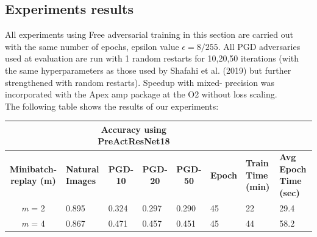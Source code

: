 \documentclass{article}
\begin{document}
\subsection{Experiments results}
All experiments using Free adversarial training in this section are carried out with the same number of epochs, epsilon value $\epsilon = 8/255$. All PGD adversaries used at
evaluation are run with 1 random restarts for 10,20,50 iterations (with the same hyperparameters as those
used by Shafahi et al. (2019) \cite{ShafahiEtAl2019b} but further strengthened with random restarts). Speedup with mixed-
precision was incorporated with the Apex amp package at the O2 without loss scaling.\\
The following table shows the results of our experiments:
\begin{table}[hbt!]
\begin{tabular}{|c|l|l|l|l|l|l|p{2cm}|}
\hline
\multicolumn{1}{|l|}{{ }}        & \multicolumn{4}{c|}{{ \textbf{Accuracy using PreActResNet18}}}                                                                                                                                                                            & \multicolumn{3}{l|}{{ }}                                                                                                                                                       \\ \hline
{ \textbf{Minibatch-replay (m)}} & \multicolumn{1}{p{1.5cm}|}{{ \textbf{Natural Images}}} & \multicolumn{1}{c|}{{ \textbf{PGD-10}}} & \multicolumn{1}{c|}{{ \textbf{PGD-20}}} & \multicolumn{1}{c|}{{ \textbf{PGD-50}}} & \multicolumn{1}{c|}{{ \textbf{Epoch}}} & \multicolumn{1}{p{1.5cm}|}{{ \textbf{Train Time (min)}}} & \multicolumn{1}{p{1.5cm}|}{{ \textbf{Avg Epoch Time (sec)}}} \\ \hline
{ \textit{m} = 2}                & { 0.895}                                        & { 0.324}                                & { 0.297}                                & { 0.290}                                & { 45}                                  & { 22 }                               & { 29.4 }                                 \\ \hline
{ \textit{m} = 4}                & { 0.867}                                        & { 0.471}                                & { 0.457}                                & { 0.451}                                & { 45}                                  & { 44 }                               & { 58.2 }                                 \\ \hline

\end{tabular}
\end{table}
\end{document}
